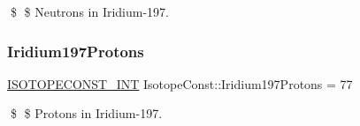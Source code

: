 \$ \$ Neutrons in Iridium-\/197. \mbox{\label{group___isotope_const-_iridium-_ir197_ga274b32d97e843d83741cafa9ae49a7e0}} 
\subsubsection{\texorpdfstring{Iridium197\+Protons}{Iridium197Protons}}
{\footnotesize\ttfamily \mbox{\hyperlink{group___isotope_const-_macros_ga5f18360b3e99483a35c32d789e62621c}{I\+S\+O\+T\+O\+P\+E\+C\+O\+N\+S\+T\+\_\+\+I\+NT}} Isotope\+Const\+::\+Iridium197\+Protons = 77}

\$ \$ Protons in Iridium-\/197. 